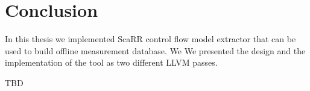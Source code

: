 
\chapter{Conclusion} %

\label{Chapter7} %

In this thesis we implemented ScaRR control flow model extractor that can be used to build offline measurement database. We We presented the design and the implementation of the tool as two different LLVM passes.

TBD